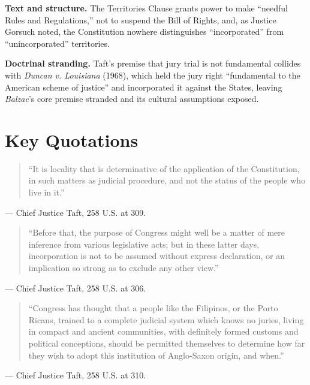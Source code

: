 \documentclass[12pt]{article}
\begin{document}
\textbf{Text and structure.} The Territories Clause grants power to make ``needful Rules and Regulations,'' not to suspend the Bill of Rights, and, as Justice Gorsuch noted, the Constitution nowhere distinguishes ``incorporated'' from ``unincorporated'' territories.

\textbf{Doctrinal stranding.} Taft's premise that jury trial is not fundamental collides with \textit{Duncan v. Louisiana} (1968), which held the jury right ``fundamental to the American scheme of justice'' and incorporated it against the States, leaving \textit{Balzac}'s core premise stranded and its cultural assumptions exposed.

\section{Key Quotations}

\begin{quote}
``It is locality that is determinative of the application of the Constitution, in such matters as judicial procedure, and not the status of the people who live in it.''
\end{quote}
\noindent --- Chief Justice Taft, 258 U.S. at 309.

\begin{quote}
``Before that, the purpose of Congress might well be a matter of mere inference from various legislative acts; but in these latter days, incorporation is not to be assumed without express declaration, or an implication so strong as to exclude any other view.''
\end{quote}
\noindent --- Chief Justice Taft, 258 U.S. at 306.

\begin{quote}
``Congress has thought that a people like the Filipinos, or the Porto Ricans, trained to a complete judicial system which knows no juries, living in compact and ancient communities, with definitely formed customs and political conceptions, should be permitted themselves to determine how far they wish to adopt this institution of Anglo-Saxon origin, and when.''
\end{quote}
\noindent --- Chief Justice Taft, 258 U.S. at 310.
\end{document}
